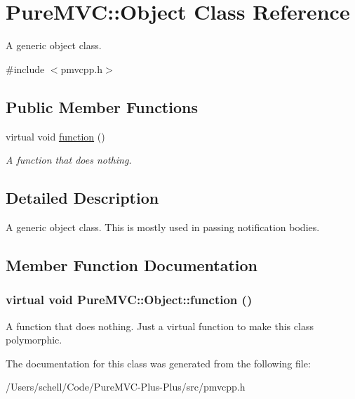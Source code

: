 \hypertarget{class_pure_m_v_c_1_1_object}{
\section{PureMVC::Object Class Reference}
\label{class_pure_m_v_c_1_1_object}
}


A generic object class.  


{\ttfamily \#include $<$pmvcpp.h$>$}\subsection*{Public Member Functions}
\begin{DoxyCompactItemize}
\item 
virtual void \hyperlink{class_pure_m_v_c_1_1_object_a627378feec4bb3839c1b9af16530a36b}{function} ()
\begin{DoxyCompactList}\small\item\em A function that does nothing. \item\end{DoxyCompactList}\end{DoxyCompactItemize}


\subsection{Detailed Description}
A generic object class. This is mostly used in passing notification bodies. 

\subsection{Member Function Documentation}
\hypertarget{class_pure_m_v_c_1_1_object_a627378feec4bb3839c1b9af16530a36b}{
\subsubsection[{function}]{\setlength{\rightskip}{0pt plus 5cm}virtual void PureMVC::Object::function ()}}
\label{class_pure_m_v_c_1_1_object_a627378feec4bb3839c1b9af16530a36b}


A function that does nothing. Just a virtual function to make this class polymorphic. 

The documentation for this class was generated from the following file:\begin{DoxyCompactItemize}
\item 
/Users/schell/Code/PureMVC-\/Plus-\/Plus/src/pmvcpp.h\end{DoxyCompactItemize}
